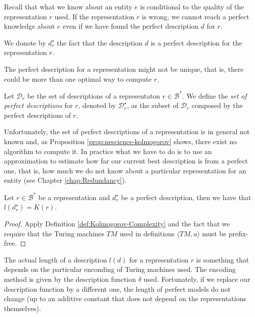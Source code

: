 Recall that what we know about an entity $e$ is conditional to the quality of the representation $r$ used. If the representation $r$ is wrong, we cannot reach a perfect knowledge about $e$ even if we have found the perfect description $d$ for $r$.

\begin{notation}
We donote by $d_r^{\star}$ the fact that the description $d$ is a perfect description for the representation $r$.
\end{notation}

The perfect description for a representation might not be unique, that is, there could be more than one optimal way to compute $r$.

\begin{definition}
\label{def:set_descriptions_perfect_model}
Let $\mathcal{D}_r$ be the set of descriptions of a representaton $r \in \mathcal{B}^\ast$. We define the \emph{set of perfect descriptions} for $r$, denoted by $\mathcal{D}^\star_r$, as the subset of $\mathcal{D}_r$ composed by the perfect descriptions of $r$.
\end{definition}

Unfortunately, the set of perfect descriptions of a representation is in general not known and, as Proposition \ref{prop:nescience-kolmogorov} shows, there exist no algorithm to compute it. In practice what we have to do is to use an approximation to estimate how far our current best description is from a perfect one, that is, how much we do not know about a particular representation for an entity (see Chapter \ref{chap:Redundancy}).

\begin{proposition}
\label{prop:nescience-kolmogorov}
Let $r \in \mathcal{B}^\ast$ be a representation and $d_r^{\star}$ be a perfect description, then we have that $l \left( d_r^{\star} \right) = K\left( r \right)$.
\end{proposition}
\begin{proof}
Apply Definition \ref{def:Kolmogorov-Complexity} and the fact that we require that the Turing machines $TM$ used in definitions $\langle TM,a\rangle$ must be prefix-free.
\end{proof}

The actual length of a description $l \left( d \right)$ for a representation $r$ is something that depends on the particular enconding of Turing machines used. The encoding method is given by the description function $\delta$ used. Fortunately, if we replace our description function by a different one, the length of perfect models do not change (up to an additive constant that does not depend on the representations themselves).


